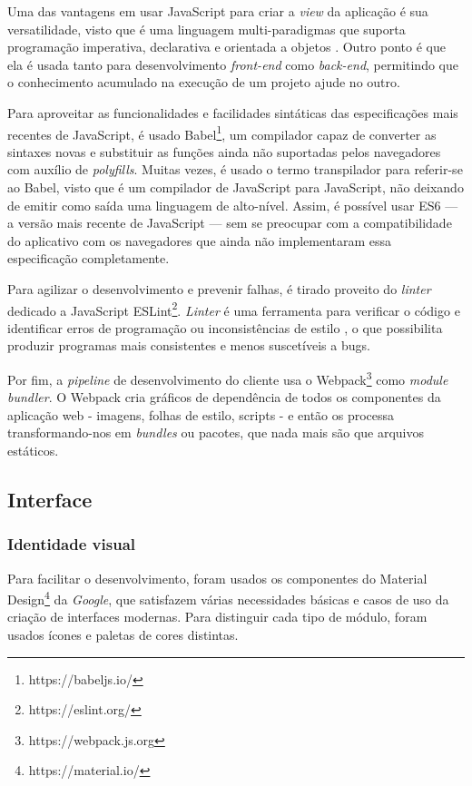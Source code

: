 Uma das vantagens em usar JavaScript para criar a \emph{view} da aplicação é sua versatilidade, visto que é uma linguagem multi-paradigmas que suporta programação imperativa, declarativa e orientada a objetos \cite{mdnjs}. Outro ponto é que ela é usada tanto para desenvolvimento \emph{front-end} como \emph{back-end}, permitindo que o conhecimento acumulado na execução de um projeto ajude no outro.

Para aproveitar as funcionalidades e facilidades sintáticas das especificações mais recentes de JavaScript, é usado Babel\footnote{https://babeljs.io/}, um compilador capaz de converter as sintaxes novas e substituir as funções ainda não suportadas pelos navegadores com auxílio de \textit{polyfills}. Muitas vezes, é usado o termo transpilador para referir-se ao Babel, visto que é um compilador de JavaScript para JavaScript, não deixando de emitir como saída uma linguagem de alto-nível. Assim, é possível usar ES6 --- a versão mais recente de JavaScript --- sem se preocupar com a compatibilidade do aplicativo com os navegadores que ainda não implementaram essa especificação completamente.

Para agilizar o desenvolvimento e prevenir falhas, é tirado proveito do \textit{linter} dedicado a JavaScript ESLint\footnote{https://eslint.org/}. \textit{Linter} é uma ferramenta para verificar o código e identificar erros de programação ou inconsistências de estilo \cite{linter}, o que possibilita produzir programas mais consistentes e menos suscetíveis a bugs.

Por fim, a \emph{pipeline} de desenvolvimento do cliente usa o Webpack\footnote{https://webpack.js.org} como \textit{module bundler}. O Webpack cria gráficos de dependência de todos os componentes da aplicação web - imagens, folhas de estilo, scripts - e então os processa transformando-nos em \textit{bundles} ou pacotes, que nada mais são que arquivos estáticos.

\subsection{Interface}

\subsubsection{Identidade visual}

Para facilitar o desenvolvimento, foram usados os componentes do Material Design\footnote{https://material.io/} da \emph{Google}, que satisfazem várias necessidades básicas e casos de uso da criação de interfaces modernas. Para distinguir cada tipo de módulo, foram usados ícones e paletas de cores distintas.

